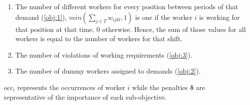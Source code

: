 \documentclass[../../thesis.tex]{subfiles}
\begin{document}
\begin{enumerate}
  \item The number of different workers for every position between periods of that demand (\ref{obj:1}), $min(\sum_{j \in T} w_{ijkl}, 1)$ is one if the worker $i$ is working for that position at that time, 0 otherwise. Hence, the sum of those values for all workers is equal to the number of workers for that shift.
  \item The number of violations of working requirements (\ref{obj:3}).
  \item The number of dummy workers assigned to demands (\ref{obj:2}).
\end{enumerate}

$occ_i$ represents the occurrences of worker $i$ while the penalties $\bm{\delta}$ are representative of the importance of each sub-objective.
\end{document}

